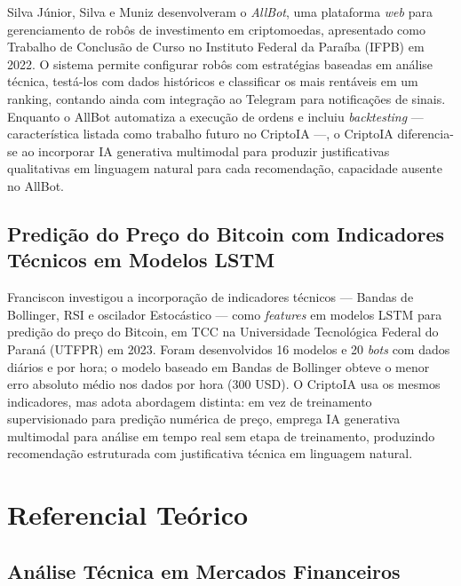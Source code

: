 \documentclass[conference]{IEEEtran}
\begin{document}
Silva J\'unior, Silva e Muniz \cite{silvajunior2022allbot} desenvolveram o \textit{AllBot}, uma plataforma \textit{web} para gerenciamento de rob\^{o}s de investimento em criptomoedas, apresentado como Trabalho de Conclus\~ao de Curso no Instituto Federal da Para\'iba (IFPB) em 2022. O sistema permite configurar rob\^{o}s com estrat\'egias baseadas em an\'alise t\'ecnica, test\'a-los com dados hist\'oricos e classificar os mais rent\'aveis em um ranking, contando ainda com integra\c{c}\~ao ao Telegram para notifica\c{c}\~oes de sinais. Enquanto o AllBot automatiza a execu\c{c}\~ao de ordens e incluiu \textit{backtesting} --- caracter\'istica listada como trabalho futuro no CriptoIA ---, o CriptoIA diferencia-se ao incorporar IA generativa multimodal para produzir justificativas qualitativas em linguagem natural para cada recomenda\c{c}\~ao, capacidade ausente no AllBot.

\subsection{Predi\c{c}\~ao do Pre\c{c}o do Bitcoin com Indicadores T\'ecnicos em Modelos LSTM}

Franciscon \cite{franciscon2023lstm} investigou a incorpora\c{c}\~ao de indicadores t\'ecnicos --- Bandas de Bollinger, RSI e oscilador Estoc\'astico --- como \textit{features} em modelos LSTM para predi\c{c}\~ao do pre\c{c}o do Bitcoin, em TCC na Universidade Tecnol\'ogica Federal do Paran\'a (UTFPR) em 2023. Foram desenvolvidos 16 modelos e 20 \textit{bots} com dados di\'arios e por hora; o modelo baseado em Bandas de Bollinger obteve o menor erro absoluto m\'edio nos dados por hora (300 USD). O CriptoIA usa os mesmos indicadores, mas adota abordagem distinta: em vez de treinamento supervisionado para predi\c{c}\~ao num\'erica de pre\c{c}o, emprega IA generativa multimodal para an\'alise em tempo real sem etapa de treinamento, produzindo recomenda\c{c}\~ao estruturada com justificativa t\'ecnica em linguagem natural.

\section{Referencial Teórico}
\label{sec:referencial}

\subsection{Análise Técnica em Mercados Financeiros}
\end{document}
